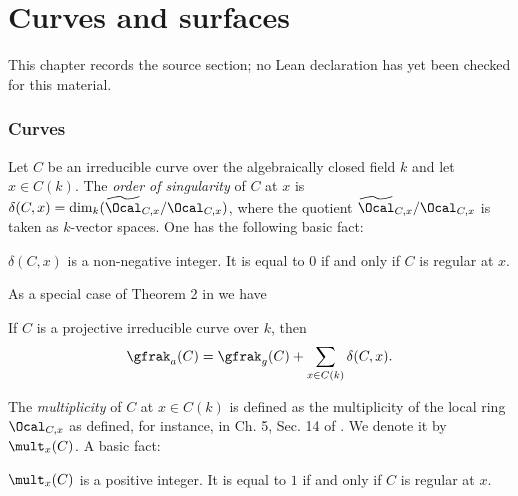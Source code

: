 \chapter{Curves and surfaces}
\label{chabauty-coleman-bound-surfaces-chapter-03}

\begin{remark}
\label{chabauty-coleman-bound-surfaces-chapter-03-source}
This chapter records the source section; no Lean declaration has yet been checked for this material.
\notready
\end{remark}

\subsection{Curves} Let $C$ be an irreducible curve over the algebraically closed field $k$ and let $x\in C(k)$. The \emph{order of singularity} of $C$ at $x$ is $\delta(C,x)=\dim_k(\widetilde{\Ocal}_{C,x}/\Ocal_{C,x})$, where the quotient $\widetilde{\Ocal}_{C,x}/\Ocal_{C,x}$ is taken as $k$-vector spaces. One has the following basic fact:
\begin{lemma}
\notready $\delta(C,x)$ is a non-negative integer. It is equal to $0$ if and only if $C$ is regular at $x$.
\end{lemma}

As a special case of Theorem 2 in \cite{Hironaka} we have

\begin{lemma}[Hironaka]
\notready\label{LemmaHironakaGenus} If $C$ is a projective irreducible curve over $k$, then
$$
\gfrak_a(C)=\gfrak_g(C) + \sum_{x\in C(k)} \delta(C,x).
$$

\end{lemma}

The \emph{multiplicity} of $C$ at  $x\in C(k)$ is defined as the multiplicity of the local ring $\Ocal_{C,x}$ as defined, for instance, in Ch.  5, Sec. 14 of \cite{Matsumura}. We denote it by $\mult_x(C)$. A basic fact:
\begin{lemma}
\notready $\mult_x(C)$ is a positive integer. It is equal to $1$ if and only if $C$ is regular at $x$.
\end{lemma}

